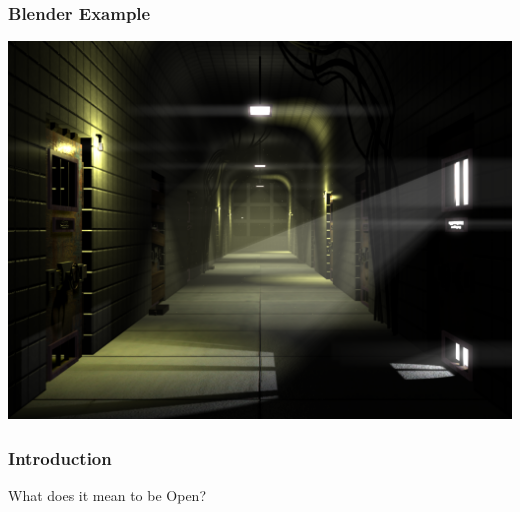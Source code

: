 \documentclass{beamer}
\begin{document}
\begin{frame}
  \frametitle{Blender Example}
    \includegraphics[width=\textwidth]{../img/blendermine}
\end{frame}

\begin{frame}
  \frametitle{Introduction}
  \begin{center}\begin{LARGE}What does it mean to be Open?\end{LARGE}\end{center}
\end{frame}
\end{document}
